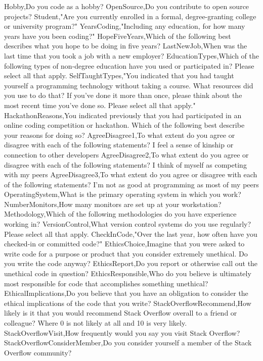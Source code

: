 \begin{appendices}
Hobby,Do you code as a hobby?
OpenSource,Do you contribute to open source projects?
Student,"Are you currently enrolled in a formal, degree-granting college or university program?"
YearsCoding,"Including any education, for how many years have you been coding?"
HopeFiveYears,Which of the following best describes what you hope to be doing in five years?
LastNewJob,When was the last time that you took a job with a new employer?
EducationTypes,Which of the following types of non-degree education have you used or participated in? Please select all that apply.
SelfTaughtTypes,"You indicated that you had taught yourself a programming technology without taking a course. What resources did you use to do that? If you’ve done it more than once, please think about the most recent time you’ve done so. Please select all that apply."
HackathonReasons,You indicated previously that you had participated in an online coding competition or hackathon.  Which of the following best describe your reasons for doing so?
AgreeDisagree1,To what extent do you agree or disagree with each of the following statements? I feel a sense of kinship or connection to other developers
AgreeDisagree2,To what extent do you agree or disagree with each of the following statements? I think of myself as competing with my peers
AgreeDisagree3,To what extent do you agree or disagree with each of the following statements? I'm not as good at programming as most of my peers
OperatingSystem,What is the primary operating system in which you work?
NumberMonitors,How many monitors are set up at your workstation?
Methodology,Which of the following methodologies do you have experience working in?
VersionControl,What version control systems do you use regularly? Please select all that apply.
CheckInCode,"Over the last year, how often have you checked-in or committed code?"
EthicsChoice,Imagine that you were asked to write code for a purpose or product that you consider extremely unethical. Do you write the code anyway?
EthicsReport,Do you report or otherwise call out the unethical code in question?
EthicsResponsible,Who do you believe is ultimately most responsible for code that accomplishes something unethical?
EthicalImplications,Do you believe that you have an obligation to consider the ethical implications of the code that you write?
StackOverflowRecommend,How likely is it that you would recommend Stack Overflow overall to a friend or colleague? Where 0 is not likely at all and 10 is very likely.
StackOverflowVisit,How frequently would you say you visit Stack Overflow?
StackOverflowConsiderMember,Do you consider yourself a member of the Stack Overflow community?

\end{appendices}
